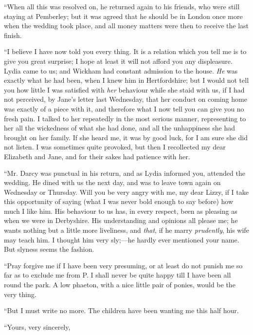 “When all this was resolved on, he returned again to his friends, who were still staying at Pemberley; but it was agreed that he should be in London once more when the wedding took place, and all money matters were then to receive the last finish.

“I believe I have now told you every thing. It is a relation which you tell me is to give you great surprise; I hope at least it will not afford you any displeasure. Lydia came to us; and Wickham had constant admission to the house. {\em He} was exactly what he had been, when I knew him in Hertfordshire; but I would not tell you how little I was satisfied with {\em her} behaviour while she staid with us, if I had not perceived, by Jane's letter last Wednesday, that her conduct on coming home was exactly of a piece with it, and therefore what I now tell you can give you no fresh pain. I talked to her repeatedly in the most serious manner, representing to her all the wickedness of what she had done, and all the unhappiness she had brought on her family. If she heard me, it was by good luck, for I am sure she did not listen. I was sometimes quite provoked, but then I recollected my dear Elizabeth and Jane, and for their sakes had patience with her.

“Mr. Darcy was punctual in his return, and as Lydia informed you, attended the wedding. He dined with us the next day, and was to leave town again on Wednesday or Thursday. Will you be very angry with me, my dear Lizzy, if I take this opportunity of saying (what I was never bold enough to say before) how much I like him. His behaviour to us has, in every respect, been as pleasing as when we were in Derbyshire. His understanding and opinions all please me; he wants nothing but a little more liveliness, and {\em that}, if he marry {\em prudently}, his wife may teach him. I thought him very sly;---he hardly ever mentioned your name. But slyness seems the fashion.

“Pray forgive me if I have been very presuming, or at least do not punish me so far as to exclude me from P. I shall never be quite happy till I have been all round the park. A low phaeton, with a nice little pair of ponies, would be the very thing.

“But I must write no more. The children have been wanting me this half hour.

“Yours, very sincerely,\crlf
{}

